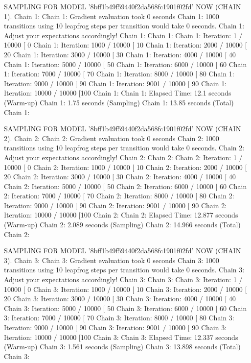 \documentclass[
]{jss}
\begin{document}
\begin{CodeChunk}
\begin{CodeOutput}
SAMPLING FOR MODEL '8bff1b49f59440f2da568fc1901f02fd' NOW (CHAIN 1).
Chain 1: 
Chain 1: Gradient evaluation took 0 seconds
Chain 1: 1000 transitions using 10 leapfrog steps per transition would take 0 seconds.
Chain 1: Adjust your expectations accordingly!
Chain 1: 
Chain 1: 
Chain 1: Iteration:    1 / 10000 [  0%
Chain 1: Iteration: 1000 / 10000 [ 10%
Chain 1: Iteration: 2000 / 10000 [ 20%
Chain 1: Iteration: 3000 / 10000 [ 30%
Chain 1: Iteration: 4000 / 10000 [ 40%
Chain 1: Iteration: 5000 / 10000 [ 50%
Chain 1: Iteration: 6000 / 10000 [ 60%
Chain 1: Iteration: 7000 / 10000 [ 70%
Chain 1: Iteration: 8000 / 10000 [ 80%
Chain 1: Iteration: 9000 / 10000 [ 90%
Chain 1: Iteration: 9001 / 10000 [ 90%
Chain 1: Iteration: 10000 / 10000 [100%
Chain 1: 
Chain 1:  Elapsed Time: 12.1 seconds (Warm-up)
Chain 1:                1.75 seconds (Sampling)
Chain 1:                13.85 seconds (Total)
Chain 1: 

SAMPLING FOR MODEL '8bff1b49f59440f2da568fc1901f02fd' NOW (CHAIN 2).
Chain 2: 
Chain 2: Gradient evaluation took 0 seconds
Chain 2: 1000 transitions using 10 leapfrog steps per transition would take 0 seconds.
Chain 2: Adjust your expectations accordingly!
Chain 2: 
Chain 2: 
Chain 2: Iteration:    1 / 10000 [  0%
Chain 2: Iteration: 1000 / 10000 [ 10%
Chain 2: Iteration: 2000 / 10000 [ 20%
Chain 2: Iteration: 3000 / 10000 [ 30%
Chain 2: Iteration: 4000 / 10000 [ 40%
Chain 2: Iteration: 5000 / 10000 [ 50%
Chain 2: Iteration: 6000 / 10000 [ 60%
Chain 2: Iteration: 7000 / 10000 [ 70%
Chain 2: Iteration: 8000 / 10000 [ 80%
Chain 2: Iteration: 9000 / 10000 [ 90%
Chain 2: Iteration: 9001 / 10000 [ 90%
Chain 2: Iteration: 10000 / 10000 [100%
Chain 2: 
Chain 2:  Elapsed Time: 12.877 seconds (Warm-up)
Chain 2:                2.089 seconds (Sampling)
Chain 2:                14.966 seconds (Total)
Chain 2: 

SAMPLING FOR MODEL '8bff1b49f59440f2da568fc1901f02fd' NOW (CHAIN 3).
Chain 3: 
Chain 3: Gradient evaluation took 0 seconds
Chain 3: 1000 transitions using 10 leapfrog steps per transition would take 0 seconds.
Chain 3: Adjust your expectations accordingly!
Chain 3: 
Chain 3: 
Chain 3: Iteration:    1 / 10000 [  0%
Chain 3: Iteration: 1000 / 10000 [ 10%
Chain 3: Iteration: 2000 / 10000 [ 20%
Chain 3: Iteration: 3000 / 10000 [ 30%
Chain 3: Iteration: 4000 / 10000 [ 40%
Chain 3: Iteration: 5000 / 10000 [ 50%
Chain 3: Iteration: 6000 / 10000 [ 60%
Chain 3: Iteration: 7000 / 10000 [ 70%
Chain 3: Iteration: 8000 / 10000 [ 80%
Chain 3: Iteration: 9000 / 10000 [ 90%
Chain 3: Iteration: 9001 / 10000 [ 90%
Chain 3: Iteration: 10000 / 10000 [100%
Chain 3: 
Chain 3:  Elapsed Time: 12.337 seconds (Warm-up)
Chain 3:                1.561 seconds (Sampling)
Chain 3:                13.898 seconds (Total)
Chain 3: 


\end{CodeOutput}
\end{CodeChunk}
\end{document}

